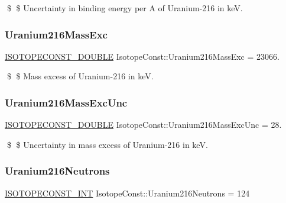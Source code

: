 \$ \$ Uncertainty in binding energy per A of Uranium-\/216 in keV. \mbox{\label{group___isotope_const-_uranium-_u216_gaf07ffb974b38f54929b777d3899dbed9}} 
\subsubsection{\texorpdfstring{Uranium216\+Mass\+Exc}{Uranium216MassExc}}
{\footnotesize\ttfamily \mbox{\hyperlink{group___isotope_const-_macros_ga8f45a7272ce02c0b4c65c44636ed719a}{I\+S\+O\+T\+O\+P\+E\+C\+O\+N\+S\+T\+\_\+\+D\+O\+U\+B\+LE}} Isotope\+Const\+::\+Uranium216\+Mass\+Exc = 23066.}

\$ \$ Mass excess of Uranium-\/216 in keV. \mbox{\label{group___isotope_const-_uranium-_u216_ga189f4d691a701772b61c86e86a82af78}} 
\subsubsection{\texorpdfstring{Uranium216\+Mass\+Exc\+Unc}{Uranium216MassExcUnc}}
{\footnotesize\ttfamily \mbox{\hyperlink{group___isotope_const-_macros_ga8f45a7272ce02c0b4c65c44636ed719a}{I\+S\+O\+T\+O\+P\+E\+C\+O\+N\+S\+T\+\_\+\+D\+O\+U\+B\+LE}} Isotope\+Const\+::\+Uranium216\+Mass\+Exc\+Unc = 28.}

\$ \$ Uncertainty in mass excess of Uranium-\/216 in keV. \mbox{\label{group___isotope_const-_uranium-_u216_gaf8dd16bcbf31c45f88bd2f010a6db7d0}} 
\subsubsection{\texorpdfstring{Uranium216\+Neutrons}{Uranium216Neutrons}}
{\footnotesize\ttfamily \mbox{\hyperlink{group___isotope_const-_macros_ga5f18360b3e99483a35c32d789e62621c}{I\+S\+O\+T\+O\+P\+E\+C\+O\+N\+S\+T\+\_\+\+I\+NT}} Isotope\+Const\+::\+Uranium216\+Neutrons = 124}

